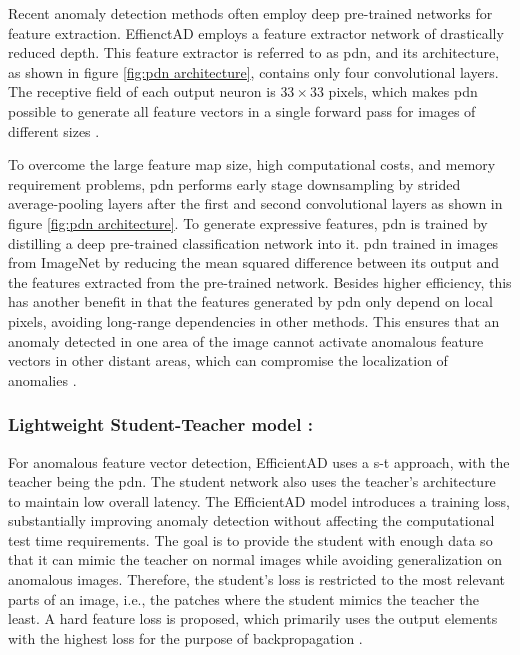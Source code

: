 Recent anomaly detection methods often employ deep pre-trained networks for feature extraction. EffienctAD employs a feature extractor network of drastically reduced depth. This feature extractor is referred to as \gls{pdn}, and its architecture, as shown in figure \ref{fig:pdn architecture}, contains only four convolutional layers. The receptive field of each output neuron is $33\times33$ pixels, which makes \gls{pdn} possible to generate all feature vectors in a single forward pass for images of different sizes \cite{batzner2024efficientadaccuratevisualanomaly}.

To overcome the large feature map size, high computational costs, and memory requirement problems, \gls{pdn} performs early stage downsampling by strided average-pooling layers after the first and second convolutional layers as shown in figure \ref{fig:pdn architecture}. To generate expressive features, \gls{pdn} is trained by distilling a deep pre-trained classification network into it. \gls{pdn} trained in images from ImageNet by reducing the mean squared difference between its output and the features extracted from the pre-trained network. Besides higher efficiency, this has another benefit in that the features generated by \gls{pdn} only depend on local pixels, avoiding long-range dependencies in other methods. This ensures that an anomaly detected in one area of the image cannot activate anomalous feature vectors in other distant areas, which can compromise the localization of anomalies \cite{batzner2024efficientadaccuratevisualanomaly}.

\subsubsection*{Lightweight Student-Teacher model :}

For anomalous feature vector detection, EfficientAD uses a \gls{s-t} approach, with the teacher being the \gls{pdn}. The student network also uses the teacher's architecture to maintain low overall latency. The EfficientAD model introduces a training loss, substantially improving anomaly detection without affecting the computational test time requirements. The goal is to provide the student with enough data so that it can mimic the teacher on normal images while avoiding generalization on anomalous images. Therefore, the student's loss is restricted to the most relevant parts of an image, i.e., the patches where the student mimics the teacher the least. A hard feature loss is proposed, which primarily uses the output elements with the highest loss for the purpose of backpropagation \cite{batzner2024efficientadaccuratevisualanomaly}.


